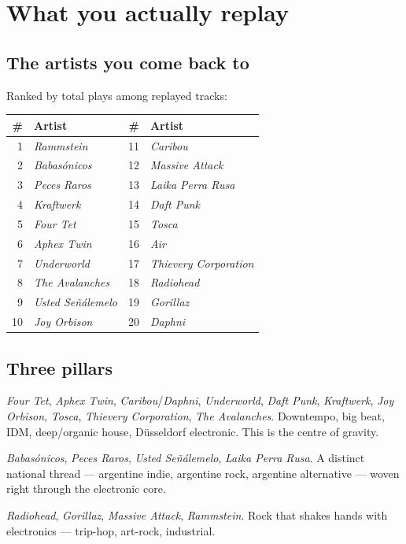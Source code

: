 \documentclass[11pt]{article}
\newcommand{\artist}[1]{\textit{#1}}
\begin{document}
\section{What you actually replay}
\subsection{The artists you come back to}
Ranked by total plays among replayed tracks:

\begin{center}
\begin{tabular}{@{}rl@{\hskip 2em}rl@{}}
\toprule
\# & Artist & \# & Artist \\
\midrule
1 & \artist{Rammstein} & 11 & \artist{Caribou} \\
2 & \artist{Babasónicos} & 12 & \artist{Massive Attack} \\
3 & \artist{Peces Raros} & 13 & \artist{Laika Perra Rusa} \\
4 & \artist{Kraftwerk} & 14 & \artist{Daft Punk} \\
5 & \artist{Four Tet} & 15 & \artist{Tosca} \\
6 & \artist{Aphex Twin} & 16 & \artist{Air} \\
7 & \artist{Underworld} & 17 & \artist{Thievery Corporation} \\
8 & \artist{The Avalanches} & 18 & \artist{Radiohead} \\
9 & \artist{Usted Señálemelo} & 19 & \artist{Gorillaz} \\
10 & \artist{Joy Orbison} & 20 & \artist{Daphni} \\
\bottomrule
\end{tabular}
\end{center}

\subsection{Three pillars}
\begin{description}[leftmargin=1.4em,style=nextline]
\item[Electronic auteurs \& intelligent dance.] \artist{Four Tet}, \artist{Aphex
Twin}, \artist{Caribou}/\artist{Daphni}, \artist{Underworld}, \artist{Daft Punk},
\artist{Kraftwerk}, \artist{Joy Orbison}, \artist{Tosca}, \artist{Thievery
Corporation}, \artist{The Avalanches}. Downtempo, big beat, IDM, deep/organic
house, Düsseldorf electronic. This is the centre of gravity.
\item[Argentine rock \& indie.] \artist{Babasónicos}, \artist{Peces Raros},
\artist{Usted Señálemelo}, \artist{Laika Perra Rusa}. A distinct national thread ---
argentine indie, argentine rock, argentine alternative --- woven right through the
electronic core.
\item[Alt-rock crossover.] \artist{Radiohead}, \artist{Gorillaz},
\artist{Massive Attack}, \artist{Rammstein}. Rock that shakes hands with
electronics --- trip-hop, art-rock, industrial.
\end{description}
\end{document}
